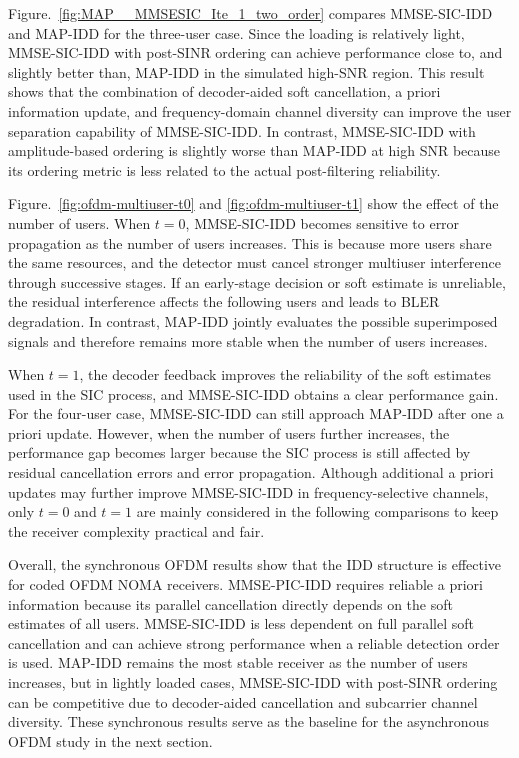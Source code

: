 Figure.~\ref{fig:MAP__MMSESIC_Ite_1_two_order} compares MMSE-SIC-IDD and MAP-IDD for the three-user case. Since the loading is relatively light, MMSE-SIC-IDD with post-SINR ordering can achieve performance close to, and slightly better than, MAP-IDD in the simulated high-SNR region. This result shows that the combination of decoder-aided soft cancellation, a priori information update, and frequency-domain channel diversity can improve the user separation capability of MMSE-SIC-IDD. In contrast, MMSE-SIC-IDD with amplitude-based ordering is slightly worse than MAP-IDD at high SNR because its ordering metric is less related to the actual post-filtering reliability.



Figure.~\ref{fig:ofdm-multiuser-t0} and \ref{fig:ofdm-multiuser-t1} show the effect of the number of users. When $t=0$, MMSE-SIC-IDD becomes sensitive to error propagation as the number of users increases. This is because more users share the same resources, and the detector must cancel stronger multiuser interference through successive stages. If an early-stage decision or soft estimate is unreliable, the residual interference affects the following users and leads to BLER degradation. In contrast, MAP-IDD jointly evaluates the possible superimposed signals and therefore remains more stable when the number of users increases.

When $t=1$, the decoder feedback improves the reliability of the soft estimates used in the SIC process, and MMSE-SIC-IDD obtains a clear performance gain. For the four-user case, MMSE-SIC-IDD can still approach MAP-IDD after one a priori update. However, when the number of users further increases, the performance gap becomes larger because the SIC process is still affected by residual cancellation errors and error propagation. Although additional a priori updates may further improve MMSE-SIC-IDD in frequency-selective channels, only $t=0$ and $t=1$ are mainly considered in the following comparisons to keep the receiver complexity practical and fair.

Overall, the synchronous OFDM results show that the IDD structure is effective for coded OFDM NOMA receivers. MMSE-PIC-IDD requires reliable a priori information because its parallel cancellation directly depends on the soft estimates of all users. MMSE-SIC-IDD is less dependent on full parallel soft cancellation and can achieve strong performance when a reliable detection order is used. MAP-IDD remains the most stable receiver as the number of users increases, but in lightly loaded cases, MMSE-SIC-IDD with post-SINR ordering can be competitive due to decoder-aided cancellation and subcarrier channel diversity. These synchronous results serve as the baseline for the asynchronous OFDM study in the next section.

